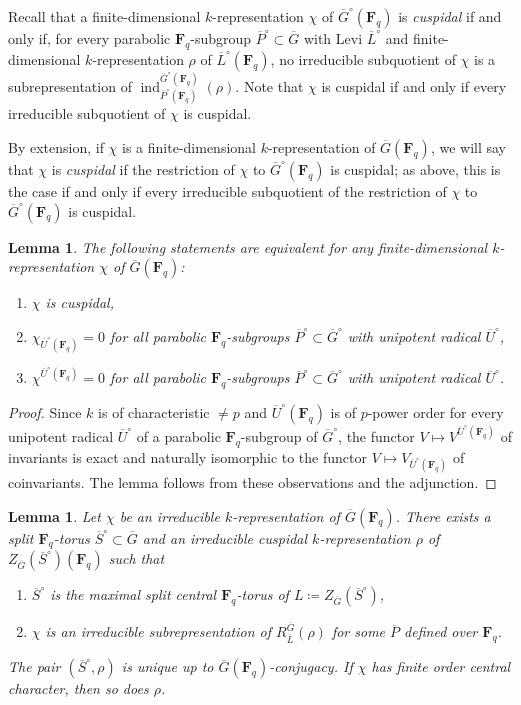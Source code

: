 \documentclass[reqno]{amsart}
\numberwithin{equation}{subsection}
\newcommand{\F}{\mathbf{F}}
\newcommand{\ol}[1]{\overline{#1}}
\DeclareMathOperator{\ind}{ind}
\newtheorem{lemma}[thm]{Lemma}
\theoremstyle{remark}
\numberwithin{equation}{subsection}
\numberwithin{figure}{subsection}
\begin{document}
Recall that a finite-dimensional $k$-representation $\chi$ of $\ol G^\circ(\F_q)$ is \textit{cuspidal} if and only if, for every parabolic $\F_q$-subgroup $\ol P^\circ \subset \ol G$ with Levi $\ol L^\circ$ and finite-dimensional $k$-representation $\rho$ of $\ol L^\circ(\F_q)$, no irreducible subquotient of $\chi$ is a subrepresentation of $\ind_{\ol P^\circ(\F_q)}^{\ol G^\circ(\F_q)}(\rho)$. Note that $\chi$ is cuspidal if and only if every irreducible subquotient of $\chi$ is cuspidal.

By extension, if $\chi$ is a finite-dimensional $k$-representation of $\ol G(\F_q)$, we will say that $\chi$ is \textit{cuspidal} if the restriction of $\chi$ to $\ol G^\circ(\F_q)$ is cuspidal; as above, this is the case if and only if every irreducible subquotient of the restriction of $\chi$ to $\ol G^\circ(\F_q)$ is cuspidal.

\begin{lemma}\label{lemma:cuspidal-equivalence}
    The following statements are equivalent for any finite-dimensional $k$-representation $\chi$ of $\ol G(\F_q)$:
    \begin{enumerate}
        \item $\chi$ is cuspidal,
        \item $\chi_{\ol U^\circ(\F_q)} = 0$ for all parabolic $\F_q$-subgroups $\ol P^\circ \subset \ol G^\circ$ with unipotent radical $\ol U^\circ$,
        \item $\chi^{\ol U^\circ(\F_q)} = 0$ for all parabolic $\F_q$-subgroups $\ol P^\circ \subset \ol G^\circ$ with unipotent radical $\ol U^\circ$.
    \end{enumerate}
\end{lemma}

\begin{proof}
    Since $k$ is of characteristic $\neq p$ and $\ol U^\circ(\F_q)$ is of $p$-power order for every unipotent radical $\ol U^\circ$ of a parabolic $\F_q$-subgroup of $\ol G^\circ$, the functor $V \mapsto V^{\ol U^\circ(\F_q)}$ of invariants is exact and naturally isomorphic to the functor $V \mapsto V_{\ol U^\circ(\F_q)}$ of coinvariants. The lemma follows from these observations and the adjunction.
\end{proof}

\begin{lemma}\label{lemma:cuspidal-supports-exist}
    Let $\chi$ be an irreducible $k$-representation of $\ol G(\F_q)$. There exists a split $\F_q$-torus $\ol S^\circ \subset \ol G$ and an irreducible cuspidal $k$-representation $\rho$ of $Z_{\ol G}(\ol S^\circ)(\F_q)$ such that
    \begin{enumerate}
        \item $\ol S^\circ$ is the maximal split central $\F_q$-torus of $L\coloneqq Z_{\ol G}(\ol S^\circ)$,
        \item $\chi$ is an irreducible subrepresentation of $R_{\ol L}^{\ol G}(\rho)$ for some $\ol P$ defined over $\F_q$.
    \end{enumerate}
    The pair $(\ol S^\circ, \rho)$ is unique up to $\ol G(\F_q)$-conjugacy. If $\chi$ has finite order central character, then so does $\rho$.
\end{lemma}
\end{document}

